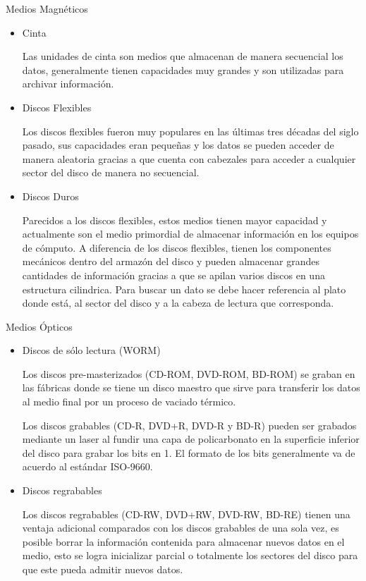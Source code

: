 Medios Magn\'{e}ticos
\begin{itemize}
  \item Cinta
  
  Las unidades de cinta son medios que almacenan de manera secuencial los datos, generalmente tienen capacidades muy grandes y son utilizadas para archivar informaci\'{o}n.
  
  \item Discos Flexibles
  
  Los discos flexibles fueron muy populares en las \'{u}ltimas tres d\'{e}cadas del siglo pasado, sus capacidades eran peque\~{n}as y los datos se pueden acceder de manera aleatoria gracias a que cuenta con cabezales para acceder a cualquier sector del disco de manera no secuencial.
  
  \item Discos Duros
  
  Parecidos a los discos flexibles, estos medios tienen mayor capacidad y actualmente son el medio primordial de almacenar informaci\'{o}n en los equipos de c\'{o}mputo. A diferencia de los discos flexibles, tienen los componentes mec\'{a}nicos dentro del armaz\'{o}n del disco y pueden almacenar grandes cantidades de informaci\'{o}n gracias a que se apilan varios discos en una estructura cilindrica. Para buscar un dato se debe hacer referencia al plato donde est\'{a}, al sector del disco y a la cabeza de lectura que corresponda.
  
\end{itemize}
Medios \'{O}pticos
\begin{itemize}
  \item Discos de s\'{o}lo lectura (WORM)
  
  Los discos pre-masterizados (CD-ROM, DVD-ROM, BD-ROM) se graban en las f\'{a}bricas donde se tiene un disco maestro que sirve para transferir los datos al medio final por un proceso de vaciado t\'{e}rmico.
  
  Los discos grabables (CD-R, DVD+R, DVD-R y BD-R) pueden ser grabados mediante un laser al fundir una capa de policarbonato en la superficie inferior del disco para grabar los bits en 1. El formato de los bits generalmente va de acuerdo al est\'{a}ndar ISO-9660.
  
  \item Discos regrabables
  
  Los discos regrabables (CD-RW, DVD+RW, DVD-RW, BD-RE) tienen una ventaja adicional comparados con los discos grabables de una sola vez, es posible borrar la informaci\'{o}n contenida para almacenar nuevos datos en el medio, esto se logra inicializar parcial o totalmente los sectores del disco para que este pueda admitir nuevos datos.
  
\end{itemize}
